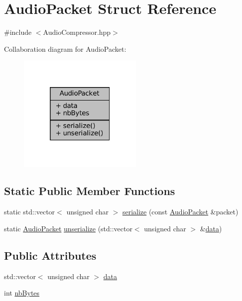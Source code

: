 \hypertarget{structAudioPacket}{}\section{Audio\+Packet Struct Reference}
\label{structAudioPacket}


{\ttfamily \#include $<$Audio\+Compressor.\+hpp$>$}



Collaboration diagram for Audio\+Packet\+:
\nopagebreak
\begin{figure}[H]
\begin{center}
\leavevmode
\includegraphics[width=169pt]{structAudioPacket__coll__graph}
\end{center}
\end{figure}
\subsection*{Static Public Member Functions}
\begin{DoxyCompactItemize}
\item 
static std\+::vector$<$ unsigned char $>$ \mbox{\hyperlink{structAudioPacket_a9ce79c4bf226482d30e4ad0e7f51e72d}{serialize}} (const \mbox{\hyperlink{structAudioPacket}{Audio\+Packet}} \&packet)
\item 
static \mbox{\hyperlink{structAudioPacket}{Audio\+Packet}} \mbox{\hyperlink{structAudioPacket_a385f44125b043e727f75a9a88435bfbd}{unserialize}} (std\+::vector$<$ unsigned char $>$ \&\mbox{\hyperlink{structAudioPacket_ac307e1b3c16bc07222501fc6fae3bc00}{data}})
\end{DoxyCompactItemize}
\subsection*{Public Attributes}
\begin{DoxyCompactItemize}
\item 
std\+::vector$<$ unsigned char $>$ \mbox{\hyperlink{structAudioPacket_ac307e1b3c16bc07222501fc6fae3bc00}{data}}
\item 
int \mbox{\hyperlink{structAudioPacket_a95c971a83513ac461f834e9caeb2fd2b}{nb\+Bytes}}
\end{DoxyCompactItemize}


